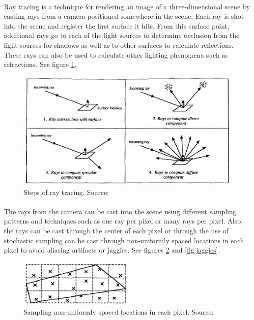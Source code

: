\paragraph{}
Ray tracing is a technique for rendering an image of a three-dimensional scene by casting rays from a camera positioned somewhere in the scene.  Each ray is shot into the scene and register the first surface it hits.  From this surface point, additional rays go to each of the light sources to determine occlusion from the light sources for shadows as well as to other surfaces to calculate reflections.  These rays can also be used to calculate other lighting phenomena such as refractions.  See figure \ref{fig:raytraceCalc}.

\begin{figure}[h!]
  \centering
    \includegraphics[width=1.0\textwidth]{raytraceCalc.jpg}
  \caption{Steps of ray tracing. Source: \protect\cite{Ward1988}}
	\label{fig:raytraceCalc}
\end{figure}

\paragraph{}
The rays from the camera can be cast into the scene using different sampling patterns and techniques such as one ray per pixel or many rays per pixel.  Also, the rays can be cast through the center of each pixel or through the use of stochastic sampling can be cast through non-uniformly spaced locations in each pixel to avoid aliasing artifacts or jaggies. See figures \ref{fig:sampling} and \ref{fig:jaggies}.

\begin{figure}[h!]
  \centering
    \includegraphics[width=0.5\textwidth]{sampling.jpg}
  \caption{Sampling non-uniformly spaced locations in each pixel. Source: \protect\cite{Reeves1987}}
	\label{fig:sampling}
\end{figure}

